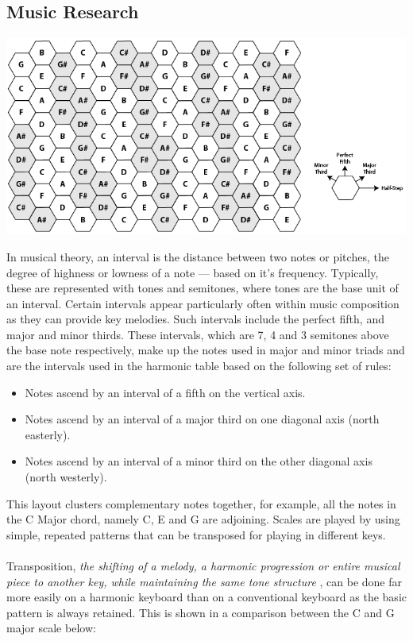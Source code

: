 \documentclass[10pt,a4paper]{article}
\begin{document}
\subsection{Music Research}
\begin{center}
\includegraphics[scale=0.5]{5.png}
\end{center}
In musical theory, an interval is the distance between two notes or pitches, the degree of highness or lowness of a note --- based on it's frequency. Typically, these are represented with tones and semitones, where tones are the base unit of an interval. Certain intervals appear particularly often within music composition as they can provide key melodies. Such intervals include the perfect fifth, and major and minor thirds. These intervals, which are 7, 4 and 3 semitones above the base note respectively, make up the notes used in major and minor triads and are the intervals used in the harmonic table based on the following set of rules:\\
\begin{itemize}
\item Notes ascend by an interval of a fifth on the vertical axis.
\item Notes ascend by an interval of a major third on one diagonal axis (north easterly).
\item Notes ascend by an interval of a minor third on the other diagonal axis (north westerly).
\end{itemize}
This layout clusters complementary notes together, for example, all the notes in the C Major chord, namely C, E and G are adjoining. Scales are played by using simple, repeated patterns that can be transposed for playing in different keys. \\
\\
Transposition, \textit{the shifting of a melody, a harmonic progression or entire musical piece to another key, while maintaining the same tone structure} \cite{koch}, can be done far more easily on a harmonic keyboard than on a conventional keyboard as the basic pattern is always retained. This is shown in a comparison between the C and G major scale below:
\end{document}
